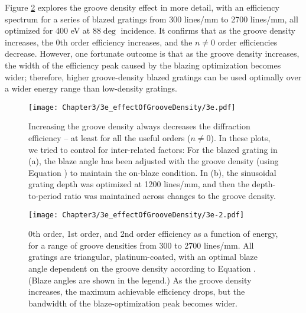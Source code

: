 Figure \ref{3e-2} explores the groove density effect in more detail, with an efficiency spectrum for a series of blazed gratings from 300 lines/mm to 2700 lines/mm, all optimized for 400 eV at 88$\deg$ incidence.  It confirms that as the groove density increases, the 0th order efficiency increases, and the $n\neq0$ order efficiencies decrease.  However, one fortunate outcome is that as the groove density increases, the width of the efficiency peak caused by the blazing optimization becomes wider; therefore, higher groove-density blazed gratings can be used optimally over a wider energy range than low-density gratings.
	
\begin{figure}[htbp] %
   \centering
   \texttt{[image: Chapter3/3e\_effectOfGrooveDensity/3e.pdf]} 
   \caption[Increasing the groove density always decreases the diffraction efficiency -- at least for all the useful orders ($n \neq 0$).]{Increasing the groove density always decreases the diffraction efficiency -- at least for all the useful orders ($n \neq 0$).  In these plots, we tried to control for inter-related factors: For the blazed grating in (a), the blaze angle has been adjusted with the groove density (using Equation \protect {}) to maintain the on-blaze condition.  In (b), the sinusoidal grating depth was optimized at 1200 lines/mm, and then the depth-to-period ratio was maintained across changes to the groove density.}
   \label{3e}
\end{figure}

\begin{figure}[htbp] %
   \centering
   \texttt{[image: Chapter3/3e\_effectOfGrooveDensity/3e-2.pdf]} 
   \caption[0th order, 1st order, and 2nd order efficiency as a function of energy, for a range of groove densities from 300 to 2700 lines/mm. As the groove density increases, the maximum achievable efficiency drops, but the bandwidth of the blaze-optimization peak becomes wider.]{0th order, 1st order, and 2nd order efficiency as a function of energy, for a range of groove densities from 300 to 2700 lines/mm.  All gratings are triangular, platinum-coated, with an optimal blaze angle dependent on the groove density according to Equation \protect {}.  (Blaze angles are shown in the legend.)  As the groove density increases, the maximum achievable efficiency drops, but the bandwidth of the blaze-optimization peak becomes wider.}
   \label{3e-2}
\end{figure}


